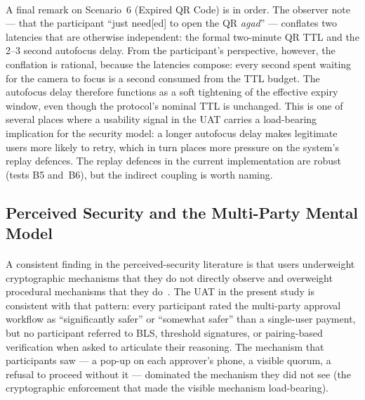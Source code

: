 \paragraph{}A final remark on Scenario~6 (Expired QR Code) is in order. The observer note --- that the participant ``just need[ed] to open the QR \textit{agad}'' --- conflates two latencies that are otherwise independent: the formal two-minute QR TTL and the 2--3 second autofocus delay. From the participant's perspective, however, the conflation is rational, because the latencies compose: every second spent waiting for the camera to focus is a second consumed from the TTL budget. The autofocus delay therefore functions as a soft tightening of the effective expiry window, even though the protocol's nominal TTL is unchanged. This is one of several places where a usability signal in the UAT carries a load-bearing implication for the security model: a longer autofocus delay makes legitimate users more likely to retry, which in turn places more pressure on the system's replay defences. The replay defences in the current implementation are robust (tests B5 and~B6), but the indirect coupling is worth naming.

\subsection{Perceived Security and the Multi-Party Mental Model}
\label{sect:disc_perceived}

\paragraph{}A consistent finding in the perceived-security literature is that users underweight cryptographic mechanisms that they do not directly observe and overweight procedural mechanisms that they do~\cite{krombholz2014}. The UAT in the present study is consistent with that pattern: every participant rated the multi-party approval workflow as ``significantly safer'' or ``somewhat safer'' than a single-user payment, but no participant referred to BLS, threshold signatures, or pairing-based verification when asked to articulate their reasoning. The mechanism that participants saw --- a pop-up on each approver's phone, a visible quorum, a refusal to proceed without it --- dominated the mechanism they did not see (the cryptographic enforcement that made the visible mechanism load-bearing).

